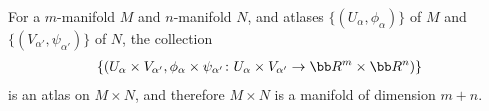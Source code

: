 For a $m$-manifold $M$ and $n$-manifold $N$, and atlases $\{(U_\alpha,\phi_\alpha)\}$ of $M$ and $\{(V_{\alpha'},\psi_{\alpha'})\}$ of $N$, the collection
\begin{align*}
  \{(U_\alpha \times V_{\alpha'}, \phi_\alpha \times \psi_{\alpha'} \colon U_\alpha \times V_{\alpha'} \to \bb R^m \times \bb R^n)\}
\end{align*}
is an atlas on $M \times N$, and therefore $M\times N$ is a manifold of dimension $m + n$.
